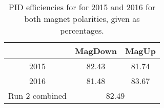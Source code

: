 \documentclass{article}
\begin{document}
\begin{table}[H]
    \centering
    \begin{tabular}{ccc}
        \toprule
        & MagDown & MagUp \\
        \midrule
        2015 & 82.43 & 81.74 \\
        2016 & 81.48 & 83.67 \\
        \midrule
        Run 2 combined & \multicolumn{2}{c}{82.49} \\
        \bottomrule
    \end{tabular}
    \caption{PID efficiencies for  for 2015 and 2016 for both magnet polarities, given as percentages.}
\label{tab:PID_efficiency_pipi}
\end{table}
\end{document}
